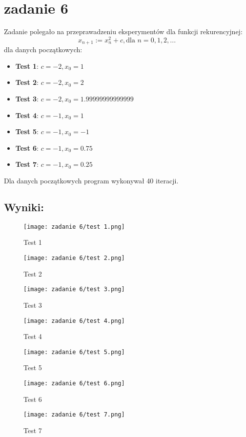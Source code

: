 \section{zadanie 6}
Zadanie polegało na przeprawadzeniu eksperymentów dla funkcji rekurencyjnej:
\[ x_{n+1} := x_n^2+c, \textrm{dla } n = 0,1,2,...\]
dla danych początkowych:
\begin{itemize}
  \item \textbf{Test 1}: \(c = -2, x_0 = 1\)
  \item \textbf{Test 2}: \(c = -2, x_0 = 2\)
  \item \textbf{Test 3}: \(c = -2, x_0 = 1.99999999999999\)
  \item \textbf{Test 4}: \(c = -1, x_0 = 1\)
  \item \textbf{Test 5}: \(c = -1, x_0 = -1\)
  \item \textbf{Test 6}: \(c = -1, x_0 = 0.75\)
  \item \textbf{Test 7}: \(c = -1, x_0 = 0.25\)
\end{itemize}
Dla danych początkowych program wykonywał 40 iteracji.
\subsection{Wyniki:}

\begin{figure}[ht]
  \centering
  \texttt{[image: zadanie 6/test 1.png]}
  \caption{Test 1}
  \label{fig:test1}
\end{figure}
\begin{figure}[ht]
  \centering
  \texttt{[image: zadanie 6/test 2.png]}
  \caption{Test 2}
  \label{fig:test2}
\end{figure}
\begin{figure}[ht]
  \centering
  \texttt{[image: zadanie 6/test 3.png]}
  \caption{Test 3}
  \label{fig:test3}
\end{figure}
\begin{figure}[ht]
  \centering
  \texttt{[image: zadanie 6/test 4.png]}
  \caption{Test 4}
  \label{fig:test4}
\end{figure}
\begin{figure}[ht]
  \centering
  \texttt{[image: zadanie 6/test 5.png]}
  \caption{Test 5}
  \label{fig:test5}
\end{figure}
\begin{figure}[ht]
  \centering
  \texttt{[image: zadanie 6/test 6.png]}
  \caption{Test 6}
  \label{fig:test6}
\end{figure}
\begin{figure}[ht]
  \centering
  \texttt{[image: zadanie 6/test 7.png]}
  \caption{Test 7}
  \label{fig:test7}
\end{figure}


